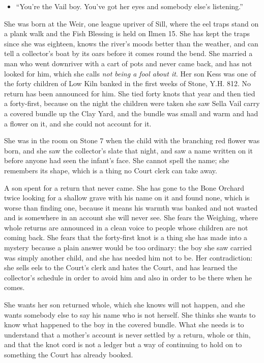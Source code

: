 \documentclass{design/chronicle}
\begin{document}
{\begin{itemize}[leftmargin=1.4em,itemsep=1pt,topsep=3pt,parsep=0pt]
\item “You’re the Vail boy. You’ve got her eyes and somebody else’s listening.”

\end{itemize}

She was born at the Weir, one league upriver of Sill, where the eel traps stand on a plank walk and the Fish Blessing is held on Ilmen 15. She has kept the traps since she was eighteen, knows the river’s moods better than the weather, and can tell a collector’s boat by its oars before it comes round the bend. She married a man who went downriver with a cart of pots and never came back, and has not looked for him, which she calls \emph{not being a fool about it}. Her son Kess was one of the forty children of Low Kiln banked in the first weeks of Stone, Y.H. 812. No return has been announced for him. She tied forty knots that year and then tied a forty-first, because on the night the children were taken she saw Sella Vail carry a covered bundle up the Clay Yard, and the bundle was small and warm and had a flower on it, and she could not account for it.

She was in the room on Stone 7 when the child with the branching red flower was born, and she saw the collector’s slate that night, and saw a name written on it before anyone had seen the infant’s face. She cannot spell the name; she remembers its shape, which is a thing no Court clerk can take away.

A son spent for a return that never came. She has gone to the Bone Orchard twice looking for a shallow grave with his name on it and found none, which is worse than finding one, because it means his warmth was banked and not wasted and is somewhere in an account she will never see. She fears the Weighing, where whole returns are announced in a clean voice to people whose children are not coming back. She fears that the forty-first knot is a thing she has made into a mystery because a plain answer would be too ordinary: the boy she saw carried was simply another child, and she has needed him not to be. Her contradiction: she sells eels to the Court’s clerk and hates the Court, and has learned the collector’s schedule in order to avoid him and also in order to be there when he comes.

She wants her son returned whole, which she knows will not happen, and she wants somebody else to say his name who is not herself. She thinks she wants to know what happened to the boy in the covered bundle. What she needs is to understand that a mother’s account is never settled by a return, whole or thin, and that the knot cord is not a ledger but a way of continuing to hold on to something the Court has already booked.

}
\end{document}
